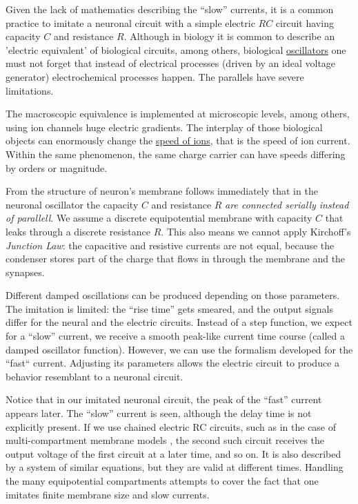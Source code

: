 Given the lack of mathematics describing the “slow” currents,
it is a common practice to imitate a neuronal circuit with a simple electric $RC$ circuit
having capacity $C$ and resistance $R$.
Although in biology it is common to describe an 'electric equivalent' of biological circuits,
among others, biological 
\hyperlink{PhysicsOscillator}
{oscillators}
one must not forget that instead of electrical processes (driven by an ideal voltage generator) 
electrochemical processes happen. The parallels have severe limitations.

The macroscopic equivalence is implemented at microscopic levels, among others,
using 
 ion channels
huge electric gradients.
The interplay of those biological objects can enormously change
the \hyperlink{StokesCurrent}{speed of ions}, that is 
the speed of ion current.
Within the same phenomenon, the same charge carrier
can have speeds differing by orders or magnitude.

From the %
structure of neuron's membrane
follows immediately that
in the %
neuronal oscillator
the
capacity $C$ and resistance $R$ \textit{are connected serially instead of parallell}.
We assume a discrete equipotential membrane with capacity $C$ that leaks through a discrete resistance $R$.
This also means we cannot apply Kirchoff's \textit{Junction Law}:
the capacitive and resistive currents are not equal, because the condenser stores part of the charge
that flows in through the membrane and the synapses.


Different damped oscillations can be produced depending on those parameters.
The imitation is limited: the “rise time” gets smeared,
and the output signals differ for the neural and the electric circuits.
Instead of a step function, we expect for a “slow” current,
we receive a smooth peak-like current time course (called a damped oscillator function).
However, we can use the formalism developed for the “fast“ current.
Adjusting its parameters allows the electric circuit to produce a behavior resemblant to a neuronal circuit.

Notice that in our imitated neuronal circuit, the peak of the “fast” current appears later.
The “slow” current is seen, although the delay time is not explicitly present.
If we use chained electric RC circuits, such as in the case of multi-compartment membrane models
\cite{MathNeuroscience:2010, MultiCompartmentNeurons:2023},
the second such circuit receives the output voltage of the first circuit at a later time, and so on.
It is also described by a system of  similar equations, but they are valid at different times.
Handling the many equipotential compartments attempts to cover the fact
that one imitates finite membrane size and slow currents.

